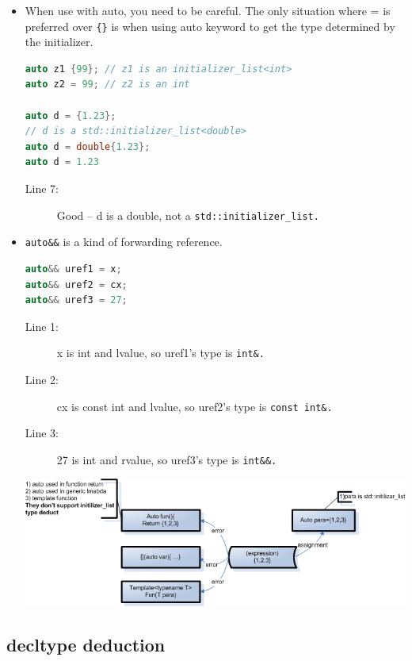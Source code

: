 \documentclass[a4paper,11pt,twoside]{book}
\begin{document}
\begin{itemize}
	\item When use with auto, you need to be careful. The only situation where = is preferred over \verb={}= is when using auto keyword to get the type determined by the initializer.
\begin{lstlisting}[frame=single, language=c++]
auto z1 {99}; // z1 is an initializer_list<int>
auto z2 = 99; // z2 is an int

auto d = {1.23};
// d is a std::initializer_list<double>
auto d = double{1.23};
auto d = 1.23
\end{lstlisting}
\begin{description}
	\item[Line 7:] Good -- d is a double, not a \texttt{std::initializer\_list.}
\end{description}

	
	\item \texttt{auto\&\&} is a kind of forwarding reference.
\begin{lstlisting}[frame=single, language=c++]
auto&& uref1 = x; 
auto&& uref2 = cx; 
auto&& uref3 = 27; 
\end{lstlisting}
\begin{description}
	\item[Line 1:] x is int and lvalue, so uref1's type is \texttt{int\&.}
	\item[Line 2:] cx is const int and lvalue, so uref2's type is \texttt{const int\&.}
	\item[Line 3:] 27 is int and rvalue, so uref3's type is \texttt{int\&\&.}
\end{description}

\begin{center}
	\includegraphics[scale=0.7]{pics/autotype.png}
\end{center}

\end{itemize}



\subsection{decltype deduction}
\end{document}
